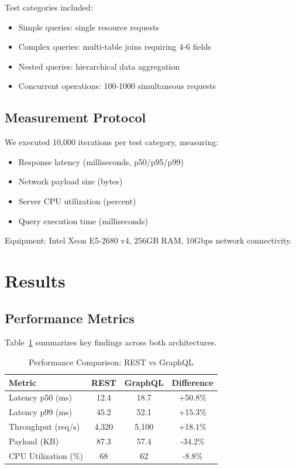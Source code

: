 \documentclass[10pt,twocolumn,letterpaper]{IEEEtran}
\begin{document}
Test categories included:
\begin{itemize}
\item Simple queries: single resource requests
\item Complex queries: multi-table joins requiring 4-6 fields
\item Nested queries: hierarchical data aggregation
\item Concurrent operations: 100-1000 simultaneous requests
\end{itemize}

\subsection{Measurement Protocol}

We executed 10,000 iterations per test category, measuring:
\begin{itemize}
\item Response latency (milliseconds, p50/p95/p99)
\item Network payload size (bytes)
\item Server CPU utilization (percent)
\item Query execution time (milliseconds)
\end{itemize}

Equipment: Intel Xeon E5-2680 v4, 256GB RAM, 10Gbps network connectivity.

\section{Results}

\subsection{Performance Metrics}

Table~\ref{tab:comparison} summarizes key findings across both architectures.

\begin{table}[h]
\centering
\caption{Performance Comparison: REST vs GraphQL}
\label{tab:comparison}
\begin{tabular}{@{}lccc@{}}
\toprule
\textbf{Metric} & \textbf{REST} & \textbf{GraphQL} & \textbf{Difference} \\
\midrule
Latency p50 (ms) & 12.4 & 18.7 & +50.8\% \\
Latency p99 (ms) & 45.2 & 52.1 & +15.3\% \\
Throughput (req/s) & 4,320 & 5,100 & +18.1\% \\
Payload (KB) & 87.3 & 57.4 & -34.2\% \\
CPU Utilization (\%) & 68 & 62 & -8.8\% \\
\bottomrule
\end{tabular}
\end{table}
\end{document}
